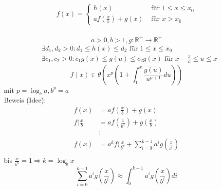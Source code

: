 \begin{align*}
f(x)=\left\{\begin{array}{ll}
h(x)&\mbox{ für }1\le  x\le x_0\\
af(\frac{x}{b})+g(x)&\mbox{ für }x>x_0
\end{array}\right.
\end{align*}
\\[.5em]
\[a>0,b>1,g:\mathbb R^+\rightarrow\mathbb R^+\]
\small
\begin{align*}
&\exists d_1,d_2>0: d_1\le h(x)\le d_2\mbox{ für }1\le x\le x_0\\
&\exists c_1,c_2>0:c_1g(x)\le g(u)\le c_2g(x)\mbox{ für }x-\frac{x}{b}\le u \le x 
\end{align*}
\normalsize
\[f(x)\in\theta(x^p(1+\int_1^x\frac{g(u)}{u^{p+1}}du))\]
mit $p=\log_ba,b^p=a$\\
Beweis (Idee):
\begin{align*}
f(x)&=af(\frac{x}{b})+g(x)\\
f(\frac{x}{b}&=af(\frac{x}{b^2})+g(\frac{x}{b})\\
&\vdots\\
f(x)&=a^kf(\frac{x}{b^k}+\sum_{i=0}^{k-1}a^ig(\frac{x}{b^i})\\
\end{align*}
bis $\frac{x}{b^k}=1\Rightarrow k=\log_bx$\\[.5em]
\[\sum_{i=0}^{k-1}a^ig(\frac{x}{b^i})\approx \int_0^{k-1}a^ig(\frac{x}{b^i})di\]
\\[.5em]
